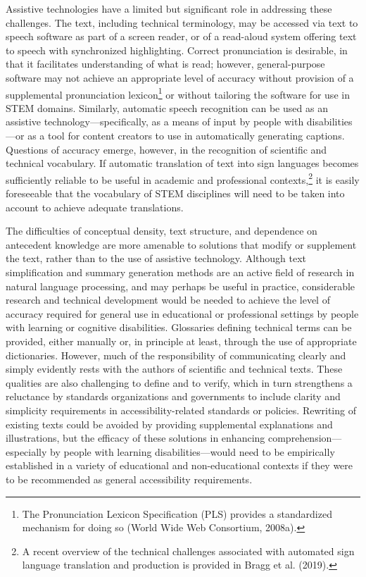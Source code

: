 \documentclass{sig-alternate} %
\begin{document}
\begin{large}
Assistive technologies have a limited but significant role in addressing these challenges. The text, including technical terminology, may be accessed via text to speech software as part of a screen reader, or of a read-aloud system offering text to speech with synchronized highlighting. Correct pronunciation is desirable, in that it facilitates understanding of what is read; however, general-purpose software may not achieve an appropriate level of accuracy without provision of a supplemental pronunciation lexicon\footnote{The Pronunciation Lexicon Specification (PLS) provides a standardized mechanism for doing so (World Wide Web Consortium, 2008a).} or without tailoring the software for use in STEM domains. Similarly, automatic speech recognition can be used as an assistive technology—spe\-cifically, as a means of input by people with disabilities—or as a tool for content creators to use in automatically generating captions. Questions of accuracy emerge, however, in the recognition of scientific and technical vocabulary. If automatic translation of text into sign languages becomes sufficiently reliable to be useful in academic and professional contexts,\footnote{A recent overview of the technical challenges associated with automated sign language translation and production is provided in Bragg et al. (2019).} it is easily foreseeable that the vocabulary of STEM disciplines will need to be taken into account to achieve adequate translations.

The difficulties of conceptual density, text structure, and dependence on antecedent knowledge are more amenable to solutions that modify or supplement the text, rather than to the use of assistive technology. Although text simplification and summary generation methods are an active field of research in natural language processing, and may perhaps be useful in practice, considerable research and technical development would be needed to achieve the level of accuracy required for general use in educational or professional settings by people with learning or cognitive disabilities. Glossaries defining technical terms can be provided, either manually or, in principle at least, through the use of appropriate dictionaries. However, much of the responsibility of communicating clearly and simply evidently rests with the authors of scientific and technical texts. These qualities are also challenging to define and to verify, which in turn strengthens a reluctance by standards organizations and governments to include clarity and simplicity requirements in accessibility-related standards or policies. Rewriting of existing texts could be avoided by providing supplemental explanations and illustrations, but the efficacy of these solutions in enhancing comprehension—especially by people with learning disabilities—would need to be empirically established in a variety of educational and non-educational contexts if they were to be recommended as general accessibility requirements.


\end{large}
\end{document}
